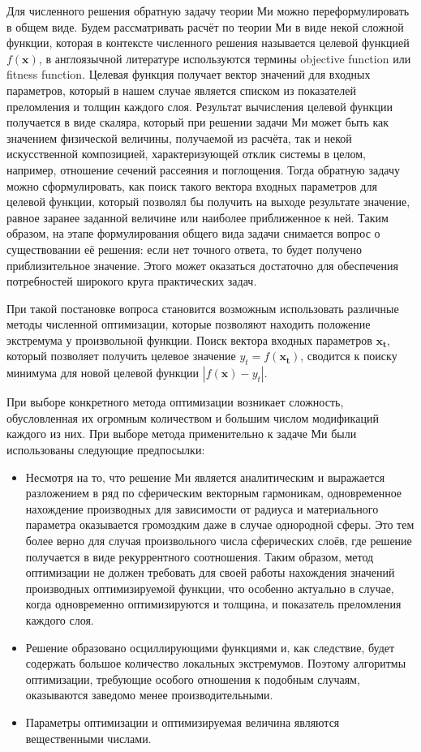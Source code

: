 Для численного решения обратную задачу теории Ми можно
переформулировать в общем виде. Будем рассматривать расчёт по теории
Ми в виде некой сложной функции, которая в контексте численного
решения называется целевой функцией $f(\mathbf{x})$, в англоязычной
литературе используются термины objective function или fitness
function.  Целевая функция получает вектор значений для входных
параметров, который в нашем случае является списком из показателей
преломления и толщин каждого слоя. Результат вычисления целевой
функции получается в виде скаляра, который при решении задачи Ми может
быть как значением физической величины, получаемой из расчёта,
так и некой искусственной композицией, характеризующей отклик системы в
целом, например, отношение сечений рассеяния и поглощения. Тогда
обратную задачу можно сформулировать, как поиск такого вектора входных
параметров для целевой функции, который позволял бы получить на выходе
результате значение, равное заранее заданной величине или наиболее
приближенное к ней. Таким образом, на этапе формулирования общего вида
задачи снимается вопрос о существовании её решения: если нет точного ответа, то будет получено приблизительное значение. Этого может оказаться достаточно для обеспечения потребностей
широкого круга практических задач.

При такой постановке вопроса становится возможным использовать
различные методы численной оптимизации, которые позволяют находить
положение экстремума у произвольной функции. Поиск вектора входных
параметров $\mathbf{x_t}$, который позволяет получить целевое значение
$y_t=f(\mathbf{x_t})$, сводится к поиску минимума для новой целевой
функции $\left|f(\mathbf{x})-y_t\right|$.

При выборе конкретного метода оптимизации возникает сложность,
обусловленная их огромным количеством и большим числом
модификаций каждого из них. При выборе метода применительно к задаче
Ми были использованы следующие предпосылки:
\begin{itemize}
\item \label{ref:why-jade} Несмотря на то, что решение Ми является аналитическим и
  выражается разложением в ряд по сферическим векторным
  гармоникам, одновременное нахождение производных для зависимости от
  радиуса и материального параметра оказывается громоздким даже в
  случае однородной сферы. Это тем более верно для случая
  произвольного числа сферических слоёв, где решение получается в виде
  рекуррентного соотношения.  Таким образом, метод оптимизации не
  должен требовать для своей работы нахождения значений производных
  оптимизируемой функции, что особенно актуально в случае, когда
  одновременно оптимизируются и толщина, и показатель преломления
  каждого слоя.
\item Решение образовано осциллирующими функциями и, как следствие,
  будет содержать большое количество локальных экстремумов. Поэтому
  алгоритмы оптимизации, требующие особого отношения к подобным
  случаям, оказываются заведомо менее производительными.
\item Параметры оптимизации и оптимизируемая величина являются
  вещественными числами.
\end{itemize}

